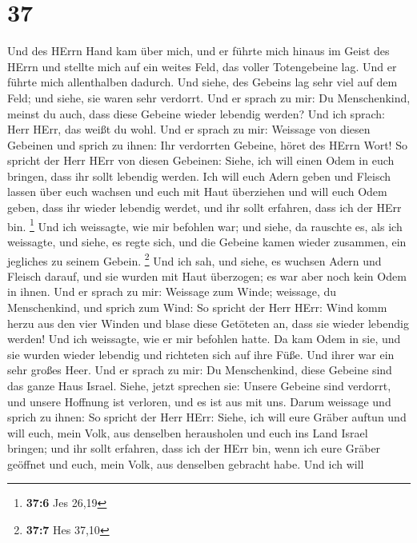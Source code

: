 \hypertarget{section-36}{%
\section{37}\label{section-36}}

 Und des HErrn Hand kam über mich, und er führte mich
hinaus im Geist des HErrn und stellte mich auf ein weites Feld, das
voller Totengebeine lag.  Und er führte mich allenthalben
dadurch. Und siehe, des Gebeins lag sehr viel auf dem Feld; und siehe,
sie waren sehr verdorrt.  Und er sprach zu mir: Du
Menschenkind, meinst du auch, dass diese Gebeine wieder lebendig werden?
Und ich sprach: Herr HErr, das weißt du wohl.  Und er
sprach zu mir: Weissage von diesen Gebeinen und sprich zu ihnen: Ihr
verdorrten Gebeine, höret des HErrn Wort!  So spricht der
Herr HErr von diesen Gebeinen: Siehe, ich will einen Odem in euch
bringen, dass ihr sollt lebendig werden.  Ich will euch
Adern geben und Fleisch lassen über euch wachsen und euch mit Haut
überziehen und will euch Odem geben, dass ihr wieder lebendig werdet,
und ihr sollt erfahren, dass ich der HErr bin. \footnote{\textbf{37:6}
  Jes 26,19}  Und ich weissagte, wie mir befohlen war; und
siehe, da rauschte es, als ich weissagte, und siehe, es regte sich, und
die Gebeine kamen wieder zusammen, ein jegliches zu seinem Gebein.
\footnote{\textbf{37:7} Hes 37,10}  Und ich sah, und
siehe, es wuchsen Adern und Fleisch darauf, und sie wurden mit Haut
überzogen; es war aber noch kein Odem in ihnen.  Und er
sprach zu mir: Weissage zum Winde; weissage, du Menschenkind, und sprich
zum Wind: So spricht der Herr HErr: Wind komm herzu aus den vier Winden
und blase diese Getöteten an, dass sie wieder lebendig werden!
 Und ich weissagte, wie er mir befohlen hatte. Da kam
Odem in sie, und sie wurden wieder lebendig und richteten sich auf ihre
Füße. Und ihrer war ein sehr großes Heer.  Und er sprach
zu mir: Du Menschenkind, diese Gebeine sind das ganze Haus Israel.
Siehe, jetzt sprechen sie: Unsere Gebeine sind verdorrt, und unsere
Hoffnung ist verloren, und es ist aus mit uns.  Darum
weissage und sprich zu ihnen: So spricht der Herr HErr: Siehe, ich will
eure Gräber auftun und will euch, mein Volk, aus denselben herausholen
und euch ins Land Israel bringen;  und ihr sollt
erfahren, dass ich der HErr bin, wenn ich eure Gräber geöffnet und euch,
mein Volk, aus denselben gebracht habe.  Und ich will
